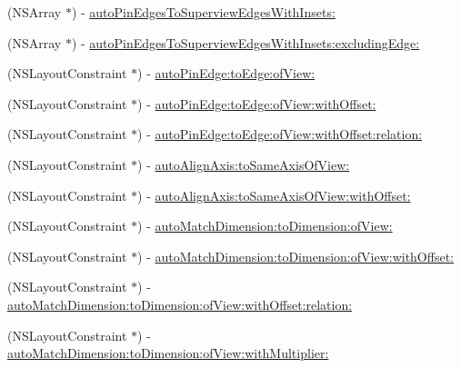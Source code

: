 \begin{DoxyCompactItemize}
\item 
(N\+S\+Array $\ast$) -\/ \mbox{\hyperlink{category_u_i_view_07_auto_layout_08_ad0cec89e366c7a6e0b9530129132ab6b}{auto\+Pin\+Edges\+To\+Superview\+Edges\+With\+Insets\+:}}
\item 
(N\+S\+Array $\ast$) -\/ \mbox{\hyperlink{category_u_i_view_07_auto_layout_08_aacb05ebd025ca11841c6bafb50c2c4d3}{auto\+Pin\+Edges\+To\+Superview\+Edges\+With\+Insets\+:excluding\+Edge\+:}}
\item 
(N\+S\+Layout\+Constraint $\ast$) -\/ \mbox{\hyperlink{category_u_i_view_07_auto_layout_08_a82daa0c5616bd83413c9d26b325f72a4}{auto\+Pin\+Edge\+:to\+Edge\+:of\+View\+:}}
\item 
(N\+S\+Layout\+Constraint $\ast$) -\/ \mbox{\hyperlink{category_u_i_view_07_auto_layout_08_a561bcfcb8fbf2acc5c36a064149ad0a2}{auto\+Pin\+Edge\+:to\+Edge\+:of\+View\+:with\+Offset\+:}}
\item 
(N\+S\+Layout\+Constraint $\ast$) -\/ \mbox{\hyperlink{category_u_i_view_07_auto_layout_08_a282d3148f229ef8db47983aedca7e2ec}{auto\+Pin\+Edge\+:to\+Edge\+:of\+View\+:with\+Offset\+:relation\+:}}
\item 
(N\+S\+Layout\+Constraint $\ast$) -\/ \mbox{\hyperlink{category_u_i_view_07_auto_layout_08_abdb4263d82cb273ce130db9a88bc3ae8}{auto\+Align\+Axis\+:to\+Same\+Axis\+Of\+View\+:}}
\item 
(N\+S\+Layout\+Constraint $\ast$) -\/ \mbox{\hyperlink{category_u_i_view_07_auto_layout_08_ab6372904858a1246f42a39596043d085}{auto\+Align\+Axis\+:to\+Same\+Axis\+Of\+View\+:with\+Offset\+:}}
\item 
(N\+S\+Layout\+Constraint $\ast$) -\/ \mbox{\hyperlink{category_u_i_view_07_auto_layout_08_a235a343b35cd0c604191823e92d7e4fb}{auto\+Match\+Dimension\+:to\+Dimension\+:of\+View\+:}}
\item 
(N\+S\+Layout\+Constraint $\ast$) -\/ \mbox{\hyperlink{category_u_i_view_07_auto_layout_08_a6a41efa402a71e6d3398d81c4bb1ceab}{auto\+Match\+Dimension\+:to\+Dimension\+:of\+View\+:with\+Offset\+:}}
\item 
(N\+S\+Layout\+Constraint $\ast$) -\/ \mbox{\hyperlink{category_u_i_view_07_auto_layout_08_a5c8f0dd1a557bcd2edfd3e841a267f96}{auto\+Match\+Dimension\+:to\+Dimension\+:of\+View\+:with\+Offset\+:relation\+:}}
\item 
(N\+S\+Layout\+Constraint $\ast$) -\/ \mbox{\hyperlink{category_u_i_view_07_auto_layout_08_a9a656d7804f7730965c0619dee4c6ea6}{auto\+Match\+Dimension\+:to\+Dimension\+:of\+View\+:with\+Multiplier\+:}}
\item 

\end{DoxyCompactItemize}
